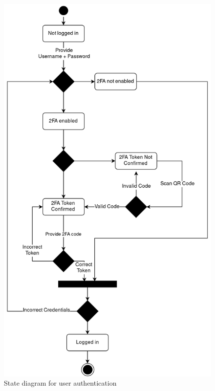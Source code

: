 \documentclass[]{article}
\begin{document}
\begin{figure}[H]
	\centering
	\includegraphics[width=\textwidth,height=\textheight,keepaspectratio]{uml/login-state-diagram.png}
	\caption{State diagram for user authentication}
\end{figure}
\end{document}
